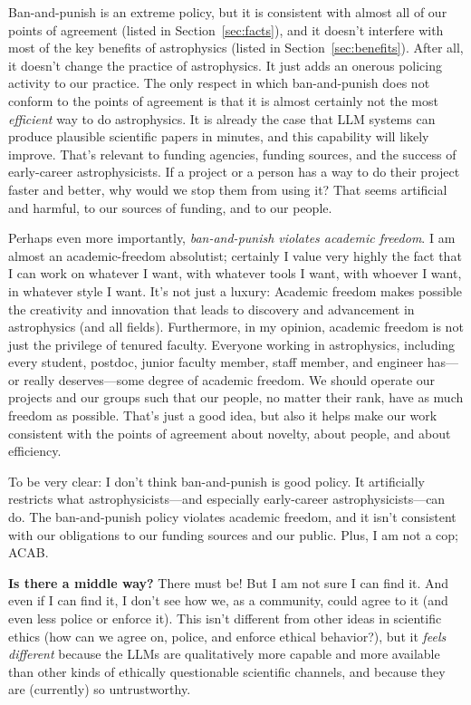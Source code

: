 \documentclass{article}
\newcommand{\sectionname}{Section}
\newcommand{\secref}[1]{\sectionname~\ref{#1}}
\newcommand{\paragraphskip}{\medskip}
\renewcommand{\paragraph}[1]{\par\paragraphskip\noindent\textbf{#1}}
\begin{document}
Ban-and-punish is an extreme policy, but it is consistent with almost all of our points of agreement (listed in \secref{sec:facts}), and it doesn't interfere with most of the key benefits of astrophysics (listed in \secref{sec:benefits}).
After all, it doesn't change the practice of astrophysics.
It just adds an onerous policing activity to our practice.
The only respect in which ban-and-punish does not conform to the points of agreement is that it is almost certainly not the most \emph{efficient} way to do astrophysics.
It is already the case that LLM systems can produce plausible scientific papers in minutes, and this capability will likely improve.
That's relevant to funding agencies, funding sources, and the success of early-career astrophysicists.
If a project or a person has a way to do their project faster and better, why would we stop them from using it?
That seems artificial and harmful, to our sources of funding, and to our people.

Perhaps even more importantly, \emph{ban-and-punish violates academic freedom}.
I am almost an academic-freedom absolutist; certainly I value very highly the fact that I can work on whatever I want, with whatever tools I want, with whoever I want, in whatever style I want.
It's not just a luxury:
Academic freedom makes possible the creativity and innovation that leads to discovery and advancement in astrophysics (and all fields).
Furthermore, in my opinion, academic freedom is not just the privilege of tenured faculty.
Everyone working in astrophysics, including every student, postdoc, junior faculty member, staff member, and engineer has---or really deserves---some degree of academic freedom.
We should operate our projects and our groups such that our people, no matter their rank, have as much freedom as possible.
That's just a good idea, but also it helps make our work consistent with the points of agreement about novelty, about people, and about efficiency.

To be very clear: I don't think ban-and-punish is good policy.
It artificially restricts what astrophysicists---and especially early-career astrophysicists---can do.
The ban-and-punish policy violates academic freedom, and it isn't consistent with our obligations to our funding sources and our public.
Plus, I am not a cop; ACAB.

\paragraph{Is there a middle way?}
There must be!
But I am not sure I can find it.
And even if I can find it, I don't see how we, as a community, could agree to it (and even less police or enforce it).
This isn't different from other ideas in scientific ethics (how can we agree on, police, and enforce ethical behavior?),
but it \emph{feels different} because the LLMs are qualitatively more capable and more available than other kinds of ethically questionable scientific channels, and because they are (currently) so untrustworthy.
\end{document}

